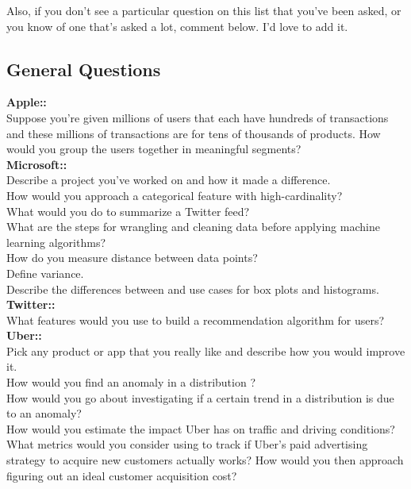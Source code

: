 \documentclass[11pt]{article}
\begin{document}
Also, if you don’t see a particular question on this list that you’ve
been asked, or you know of one that’s asked a lot, comment below. I’d
love to add it.


\subsection{General Questions}

{\bf Apple:: }\\
Suppose you’re given millions of users that each have hundreds of transactions and these millions of transactions are for tens of thousands of products. How would you group the users together in meaningful segments?\\

{\bf Microsoft:: } \\
Describe a project you’ve worked on and how it made a difference.\\
How would you approach a categorical feature with high-cardinality?\\
What would you do to summarize a Twitter feed?\\
What are the steps for wrangling and cleaning data before applying machine learning algorithms?\\
How do you measure distance between data points?\\
Define variance.\\
Describe the differences between and use cases for box plots and histograms.\\

{\bf Twitter:: }\\
What features would you use to build a recommendation algorithm for users?\\

{\bf Uber:: }\\
Pick any product or app that you really like and describe how you would improve it.\\
How would you find an anomaly in a distribution ?\\
How would you go about investigating if a certain trend in a distribution is due to an anomaly?\\
How would you estimate the impact Uber has on traffic and driving conditions?\\
What metrics would you consider using to track if Uber’s paid advertising strategy to acquire new customers actually works? How would you then approach figuring out an ideal customer acquisition cost?\\
\end{document}
